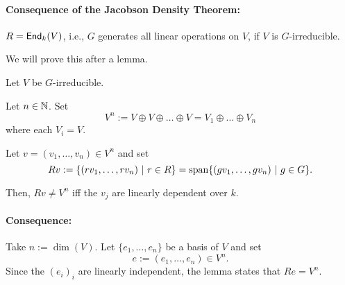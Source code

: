 \paragraph{Consequence of the Jacobson Density Theorem:} $R = \textsf{End}_k(V)$, i.e., $G$ generates all linear operations on $V$, if $V$ is $G$-irreducible.

We will prove this after a lemma.
\begin{lemma}
	Let $V$ be $G$-irreducible.
	
	Let $n \in \mathbb{N}$. Set
	\[ V^n := V \oplus V \oplus \ldots \oplus V = V_1 \oplus \ldots \oplus V_n \]
	where each $V_i = V$.
	
	Let $v = (v_1,\ldots, v_n) \in V^n$ and set
	\[ Rv := \left\lbrace(rv_1, \ldots, rv_n) ~ | ~  r \in R \right\rbrace = \mathrm{span} \{ (gv_1, \ldots, gv_n) ~|~ g \in G \}. \]
	
	Then, $Rv\neq V^n$ iff the $v_j$ are linearly dependent over $k$.
\end{lemma}
\paragraph{Consequence: } Take $n := \dim(V)$. Let $\{e_1, \ldots, e_n\}$ be a basis of $V$ and set
\[ e := (e_1, \ldots, e_n) \in V^n. \]
Since the $(e_i)_i$ are linearly independent, the lemma states that $Re = V^n$.


